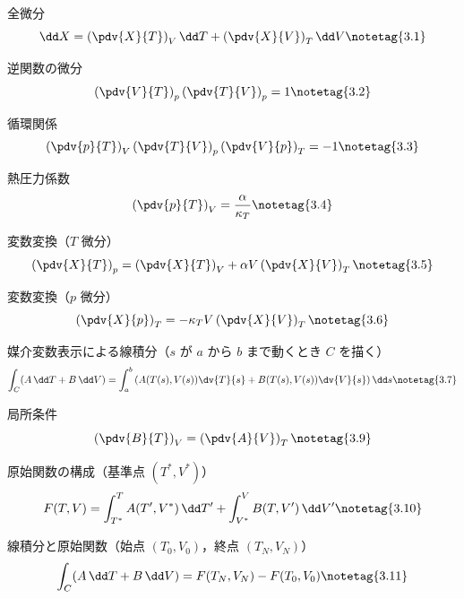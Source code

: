 \documentclass[uplatex,dvipdfmx,a4paper,11pt]{jsarticle}
\begin{document}
\begin{kirokuichiran}
\end{kirokuichiran}

\youtenseiri
\begin{noteshikilist}
  \item 全微分 %
    \[ \dd X = \left(\pdv{X}{T}\right)_{V}\dd T + \left(\pdv{X}{V}\right)_{T}\dd V \notetag{3.1} \]
  \item 逆関数の微分 %
    \[ \left(\pdv{V}{T}\right)_{p}\left(\pdv{T}{V}\right)_{p} = 1 \notetag{3.2} \]
  \item 循環関係 %
    \[ \left(\pdv{p}{T}\right)_{V}\left(\pdv{T}{V}\right)_{p}\left(\pdv{V}{p}\right)_{T} = -1 \notetag{3.3} \]
  \item 熱圧力係数 %
    \[ \left(\pdv{p}{T}\right)_{V} = \frac{\alpha}{\kappa_{T}} \notetag{3.4} \]
  \item 変数変換（$T$ 微分） %
    \[ \left(\pdv{X}{T}\right)_{p} = \left(\pdv{X}{T}\right)_{V} + \alpha V\left(\pdv{X}{V}\right)_{T} \notetag{3.5} \]
  \item 変数変換（$p$ 微分） %
    \[ \left(\pdv{X}{p}\right)_{T} = -\kappa_{T} V\left(\pdv{X}{V}\right)_{T} \notetag{3.6} \]
  \item 媒介変数表示による線積分（$s$ が $a$ から $b$ まで動くとき $C$ を描く） %
    \[ \int_{C}(A\,\dd T + B\,\dd V) = \int_{a}^{b}\left(A(T(s),V(s))\dv{T}{s} + B(T(s),V(s))\dv{V}{s}\right)\dd s \notetag{3.7} \]
  \item 局所条件 %
    \[ \left(\pdv{B}{T}\right)_{V} = \left(\pdv{A}{V}\right)_{T} \notetag{3.9} \]
  \item 原始関数の構成（基準点 $(T^{*},V^{*})$） %
    \[ F(T,V) = \int_{T^{*}}^{T} A(T',V^{*})\,\dd T' + \int_{V^{*}}^{V} B(T,V')\,\dd V' \notetag{3.10} \]
  \item 線積分と原始関数（始点 $(T_{0},V_{0})$，終点 $(T_{N},V_{N})$） %
    \[ \int_{C}(A\,\dd T + B\,\dd V) = F(T_{N},V_{N}) - F(T_{0},V_{0}) \notetag{3.11} \]
\end{noteshikilist}
\end{document}

